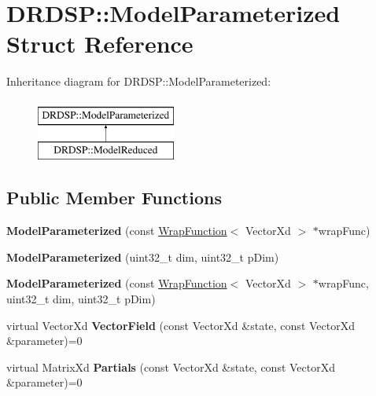 \hypertarget{struct_d_r_d_s_p_1_1_model_parameterized}{\section{D\-R\-D\-S\-P\-:\-:Model\-Parameterized Struct Reference}
\label{struct_d_r_d_s_p_1_1_model_parameterized}
}
Inheritance diagram for D\-R\-D\-S\-P\-:\-:Model\-Parameterized\-:\begin{figure}[H]
\begin{center}
\leavevmode
\includegraphics[height=2.000000cm]{struct_d_r_d_s_p_1_1_model_parameterized}
\end{center}
\end{figure}
\subsection*{Public Member Functions}
\begin{DoxyCompactItemize}
\item 
\hypertarget{struct_d_r_d_s_p_1_1_model_parameterized_a0cd93ae8805e21e731e65a732048c2b7}{{\bfseries Model\-Parameterized} (const \hyperlink{struct_d_r_d_s_p_1_1_wrap_function}{Wrap\-Function}$<$ Vector\-Xd $>$ $\ast$wrap\-Func)}\label{struct_d_r_d_s_p_1_1_model_parameterized_a0cd93ae8805e21e731e65a732048c2b7}

\item 
\hypertarget{struct_d_r_d_s_p_1_1_model_parameterized_ad23b430d7e7494f9c2142097391fc01d}{{\bfseries Model\-Parameterized} (uint32\-\_\-t dim, uint32\-\_\-t p\-Dim)}\label{struct_d_r_d_s_p_1_1_model_parameterized_ad23b430d7e7494f9c2142097391fc01d}

\item 
\hypertarget{struct_d_r_d_s_p_1_1_model_parameterized_a2f6be3362a944408c097b5981e6fbbaa}{{\bfseries Model\-Parameterized} (const \hyperlink{struct_d_r_d_s_p_1_1_wrap_function}{Wrap\-Function}$<$ Vector\-Xd $>$ $\ast$wrap\-Func, uint32\-\_\-t dim, uint32\-\_\-t p\-Dim)}\label{struct_d_r_d_s_p_1_1_model_parameterized_a2f6be3362a944408c097b5981e6fbbaa}

\item 
\hypertarget{struct_d_r_d_s_p_1_1_model_parameterized_a7fc3a7f0f10a3e4215bf67cb6e302e05}{virtual Vector\-Xd {\bfseries Vector\-Field} (const Vector\-Xd \&state, const Vector\-Xd \&parameter)=0}\label{struct_d_r_d_s_p_1_1_model_parameterized_a7fc3a7f0f10a3e4215bf67cb6e302e05}

\item 
\hypertarget{struct_d_r_d_s_p_1_1_model_parameterized_a1aa9163a2e1e92e8bc2e644832721de7}{virtual Matrix\-Xd {\bfseries Partials} (const Vector\-Xd \&state, const Vector\-Xd \&parameter)=0}\label{struct_d_r_d_s_p_1_1_model_parameterized_a1aa9163a2e1e92e8bc2e644832721de7}

\end{DoxyCompactItemize}
